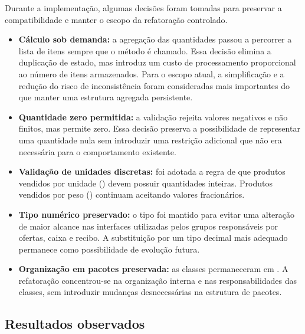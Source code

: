 Durante a implementação, algumas decisões foram tomadas para preservar a compatibilidade e manter o escopo da refatoração controlado.

\begin{itemize}

\item \textbf{Cálculo sob demanda:} a agregação das quantidades passou a percorrer a lista de itens sempre que o método  é chamado. Essa decisão elimina a duplicação de estado, mas introduz um custo de processamento proporcional ao número de itens armazenados. Para o escopo atual, a simplificação e a redução do risco de inconsistência foram consideradas mais importantes do que manter uma estrutura agregada persistente.

\item \textbf{Quantidade zero permitida:} a validação rejeita valores negativos e não finitos, mas permite zero. Essa decisão preserva a possibilidade de representar uma quantidade nula sem introduzir uma restrição adicional que não era necessária para o comportamento existente.

\item \textbf{Validação de unidades discretas:} foi adotada a regra de que produtos vendidos por unidade () devem possuir quantidades inteiras. Produtos vendidos por peso () continuam aceitando valores fracionários.

\item \textbf{Tipo numérico preservado:} o tipo  foi mantido para evitar uma alteração de maior alcance nas interfaces utilizadas pelos grupos responsáveis por ofertas, caixa e recibo. A substituição por um tipo decimal mais adequado permanece como possibilidade de evolução futura.

\item \textbf{Organização em pacotes preservada:} as classes permaneceram em . A refatoração concentrou-se na organização interna e nas responsabilidades das classes, sem introduzir mudanças desnecessárias na estrutura de pacotes.

\end{itemize}

\subsection{Resultados observados}

